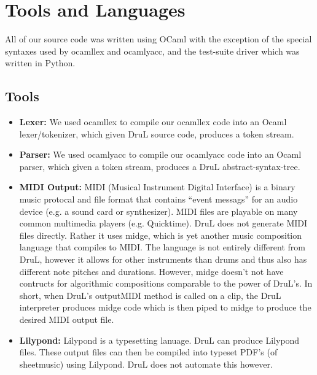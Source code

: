 \section{Tools and Languages}

All of our source code was written using OCaml with the exception of the special syntaxes used by ocamllex and ocamlyacc, and the test-suite driver which was written in Python.

\subsection{Tools}

\begin{itemize}
\item \textbf{Lexer:} We used ocamllex to compile our ocamllex code into an Ocaml lexer/tokenizer, which given DruL source code, produces a token stream.

\item \textbf{Parser:} We used ocamlyacc to compile our ocamlyacc code into an Ocaml parser, which given a token stream, produces a DruL abstract-syntax-tree.

\item \textbf{MIDI Output:} MIDI (Musical Instrument Digital Interface) is a binary music protocal and file format that contains ``event messags'' for an audio device (e.g. a sound card or synthesizer).  MIDI files are playable on many common multimedia players (e.g. Quicktime).  DruL does not generate MIDI files directly.  Rather it uses midge, which is yet another music composition language that compiles to MIDI.  The language is not entirely different from DruL, however it allows for other instruments than drums and thus also has different note pitches and durations.  However, midge doesn't not have contructs for algorithmic compositions comparable to the power of DruL's.  In short, when DruL's outputMIDI method is called on a clip, the DruL interpreter produces midge code which is then piped to midge to produce the desired MIDI output file.

\item \textbf{Lilypond:} Lilypond is a typesetting lanuage.  DruL can produce Lilypond files.  These output files can then be compiled into typeset PDF's (of sheetmusic) using Lilypond.  DruL does not automate this however.

\end{itemize}

